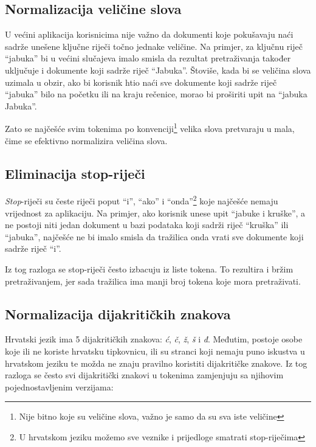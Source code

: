 \documentclass[a4paper,twoside,12pt]{scrreprt}
\begin{document}
\subsection{Normalizacija veličine slova}

U većini aplikacija korisnicima nije važno da dokumenti koje pokušavaju naći sadrže unešene ključne riječi točno jednake veličine. Na primjer, za ključnu riječ ``jabuka'' bi u većini slučajeva imalo smisla da rezultat pretraživanja također uključuje i dokumente koji sadrže riječ ``Jabuka''. Štoviše, kada bi se veličina slova uzimala u obzir, ako bi korisnik htio naći sve dokumente koji sadrže riječ ``jabuka'' bilo na početku ili na kraju rečenice, morao bi proširiti upit na ``jabuka Jabuka''.

Zato se najčešće svim tokenima po konvenciji\footnote{Nije bitno koje su veličine slova, važno je samo da su sva iste veličine} velika slova pretvaraju u mala, čime se efektivno normalizira veličina slova.

\subsection{Eliminacija stop-riječi}

\textit{Stop}-riječi su česte riječi poput ``i'', ``ako'' i ``onda''\footnote{U hrvatskom jeziku možemo sve veznike i prijedloge smatrati stop-riječima} koje najčešće nemaju vrijednost za aplikaciju. Na primjer, ako korisnik unese upit ``jabuke i kruške'', a ne postoji niti jedan dokument u bazi podataka koji sadrži riječ ``kruška'' ili ``jabuka'', najčešće ne bi imalo smisla da tražilica onda vrati sve dokumente koji sadrže riječ ``i''.

Iz tog razloga se stop-riječi često izbacuju iz liste tokena. To rezultira i bržim pretraživanjem, jer sada tražilica ima manji broj tokena koje mora pretraživati.

\subsection{Normalizacija dijakritičkih znakova}

Hrvatski jezik ima 5 dijakritičkih znakova: \textit{ć}, \textit{č}, \textit{ž}, \textit{š} i \textit{đ}. Međutim, postoje osobe koje ili ne koriste hrvatsku tipkovnicu, ili su stranci koji nemaju puno iskustva u hrvatskom jeziku te možda ne znaju pravilno koristiti dijakritičke znakove. Iz tog razloga se često svi dijakritički znakovi u tokenima zamjenjuju sa njihovim pojednostavljenim verzijama:
\end{document}
